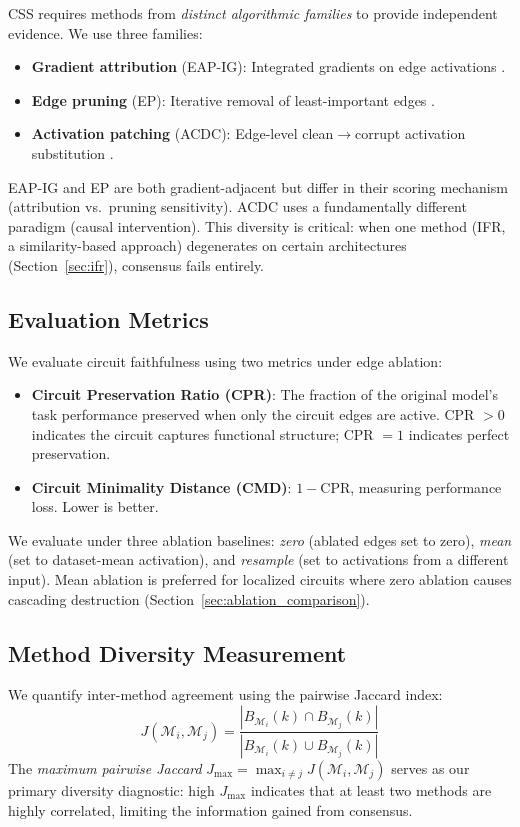 \documentclass[11pt]{article}
\newcommand{\css}{\textsc{CSS}}
\begin{document}
\css{} requires methods from \emph{distinct algorithmic families} to provide independent evidence. We use three families:
\begin{itemize}
    \item \textbf{Gradient attribution} (EAP-IG): Integrated gradients on edge activations \citep{syed2023attribution}.
    \item \textbf{Edge pruning} (EP): Iterative removal of least-important edges \citep{hanna2024have}.
    \item \textbf{Activation patching} (ACDC): Edge-level clean$\to$corrupt activation substitution \citep{conmy2023automated}.
\end{itemize}
EAP-IG and EP are both gradient-adjacent but differ in their scoring mechanism (attribution vs.\ pruning sensitivity). ACDC uses a fundamentally different paradigm (causal intervention). This diversity is critical: when one method (IFR, a similarity-based approach) degenerates on certain architectures (Section~\ref{sec:ifr}), consensus fails entirely.

\subsection{Evaluation Metrics}

We evaluate circuit faithfulness using two metrics under edge ablation:
\begin{itemize}
    \item \textbf{Circuit Preservation Ratio (CPR)}: The fraction of the original model's task performance preserved when only the circuit edges are active. CPR $> 0$ indicates the circuit captures functional structure; CPR $= 1$ indicates perfect preservation.
    \item \textbf{Circuit Minimality Distance (CMD)}: $1 - \text{CPR}$, measuring performance loss. Lower is better.
\end{itemize}
We evaluate under three ablation baselines: \emph{zero} (ablated edges set to zero), \emph{mean} (set to dataset-mean activation), and \emph{resample} (set to activations from a different input). Mean ablation is preferred for localized circuits where zero ablation causes cascading destruction (Section~\ref{sec:ablation_comparison}).

\subsection{Method Diversity Measurement}

We quantify inter-method agreement using the pairwise Jaccard index:
\begin{equation}
    J(\mathcal{M}_i, \mathcal{M}_j) = \frac{|B_{\mathcal{M}_i}(k) \cap B_{\mathcal{M}_j}(k)|}{|B_{\mathcal{M}_i}(k) \cup B_{\mathcal{M}_j}(k)|}
\end{equation}
The \emph{maximum pairwise Jaccard} $J_{\max} = \max_{i \neq j} J(\mathcal{M}_i, \mathcal{M}_j)$ serves as our primary diversity diagnostic: high $J_{\max}$ indicates that at least two methods are highly correlated, limiting the information gained from consensus.
\end{document}
